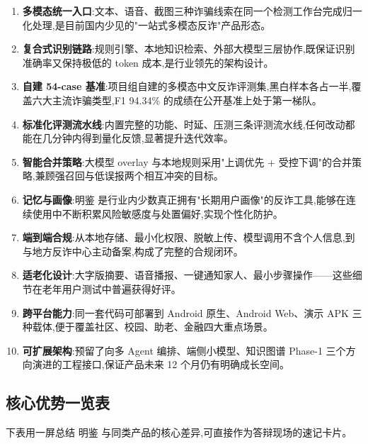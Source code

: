 \documentclass[UTF8,a4paper,12pt]{ctexart}
\begin{document}
\begin{enumerate}[leftmargin=2em,itemsep=0.3em]
    \item \textbf{多模态统一入口}:文本、语音、截图三种诈骗线索在同一个检测工作台完成归一化处理,是目前国内少见的"一站式多模态反诈"产品形态。
    \item \textbf{复合式识别链路}:规则引擎、本地知识检索、外部大模型三层协作,既保证识别准确率又保持极低的 token 成本,是行业领先的架构设计。
    \item \textbf{自建 54-case 基准}:项目组自建的多模态中文反诈评测集,黑白样本各占一半,覆盖六大主流诈骗类型,F1 94.34\% 的成绩在公开基准上处于第一梯队。
    \item \textbf{标准化评测流水线}:内置完整的功能、时延、压测三条评测流水线,任何改动都能在几分钟内得到量化反馈,显著提升迭代效率。
    \item \textbf{智能合并策略}:大模型 overlay 与本地规则采用"上调优先 + 受控下调"的合并策略,兼顾强召回与低误报两个相互冲突的目标。
    \item \textbf{记忆与画像}:明鉴 是行业内少数真正拥有"长期用户画像"的反诈工具,能够在连续使用中不断积累风险敏感度与处置偏好,实现个性化防护。
    \item \textbf{端到端合规}:从本地存储、最小化权限、脱敏上传、模型调用不含个人信息,到与地方反诈中心主动备案,构成了完整的合规闭环。
    \item \textbf{适老化设计}:大字版摘要、语音播报、一键通知家人、最小步骤操作——这些细节在老年用户测试中普遍获得好评。
    \item \textbf{跨平台能力}:同一套代码可部署到 Android 原生、Android Web、演示 APK 三种载体,便于覆盖社区、校园、助老、金融四大重点场景。
    \item \textbf{可扩展架构}:预留了向多 Agent 编排、端侧小模型、知识图谱 Phase-1 三个方向演进的工程接口,保证产品未来 12 个月仍有明确成长空间。
\end{enumerate}

\subsection{核心优势一览表}

下表用一屏总结 明鉴 与同类产品的核心差异,可直接作为答辩现场的速记卡片。
\end{document}
